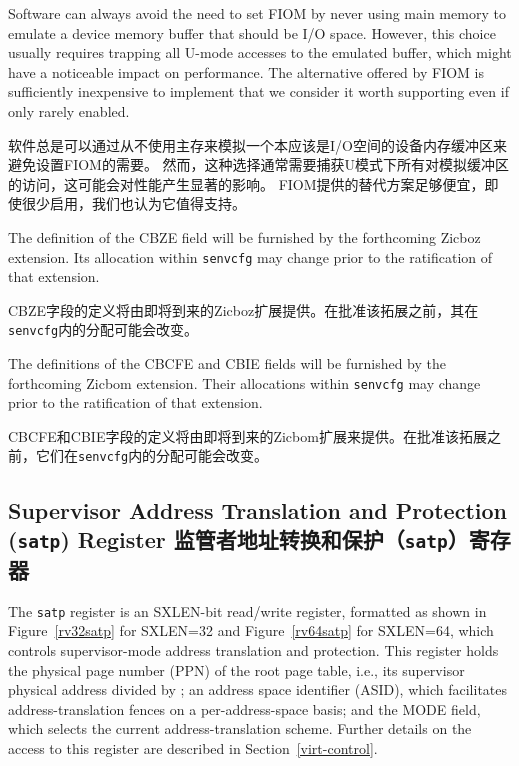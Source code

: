 \begin{commentary}
Software can always avoid the need to set FIOM by never using main
memory to emulate a device memory buffer that should be I/O space.
However, this choice usually requires trapping all U-mode accesses
to the emulated buffer, which might have a noticeable impact on
performance.
The alternative offered by FIOM is sufficiently inexpensive to implement that
we consider it worth supporting even if only rarely enabled.

软件总是可以通过从不使用主存来模拟一个本应该是I/O空间的设备内存缓冲区来避免设置FIOM的需要。
然而，这种选择通常需要捕获U模式下所有对模拟缓冲区的访问，这可能会对性能产生显著的影响。
FIOM提供的替代方案足够便宜，即使很少启用，我们也认为它值得支持。

\end{commentary}

The definition of the CBZE field will be furnished by the
forthcoming Zicboz extension.
Its allocation within {\tt senvcfg} may change prior to the ratification
of that extension.

CBZE字段的定义将由即将到来的Zicboz扩展提供。在批准该拓展之前，其在{\tt senvcfg}内的分配可能会改变。

The definitions of the CBCFE and CBIE fields will be furnished by the
forthcoming Zicbom extension.
Their allocations within {\tt senvcfg} may change prior to the ratification
of that extension.

CBCFE和CBIE字段的定义将由即将到来的Zicbom扩展来提供。在批准该拓展之前，它们在{\tt senvcfg}内的分配可能会改变。

\subsection{Supervisor Address Translation and Protection ({\tt satp}) Register 监管者地址转换和保护（{\tt satp}）寄存器}
\label{sec:satp}

The {\tt satp} register is an SXLEN-bit read/write register, formatted as shown
in Figure~\ref{rv32satp} for SXLEN=32 and Figure~\ref{rv64satp} for SXLEN=64, which
controls supervisor-mode address translation and protection.
This register holds the physical page number (PPN) of the root page
table, i.e., its supervisor physical address divided by ;
an address space identifier (ASID), which facilitates address-translation
fences on a per-address-space basis; and the MODE field, which selects the
current address-translation scheme. Further details on the access to this
register are described in Section~\ref{virt-control}.

